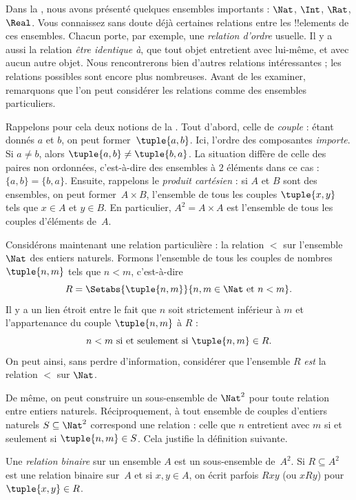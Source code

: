 \documentclass[11pt,a4paper,openany]{memoir}
\begin{document}
\begin{explain}
Dans la , nous avons présenté quelques
ensembles importants : $\Nat$, $\Int$, $\Rat$, $\Real$.
Vous connaissez sans doute déjà certaines relations entre les
!!{element}s de ces ensembles. Chacun porte, par exemple,
une \emph{relation d'ordre} usuelle. Il y a aussi la relation
\emph{être identique à}, que tout objet entretient avec lui-même,
et avec aucun autre objet. Nous rencontrerons bien d'autres
relations intéressantes ; les relations possibles sont encore
plus nombreuses. Avant de les examiner, remarquons que l'on
peut considérer les relations comme des ensembles particuliers.

Rappelons pour cela deux notions de la .
Tout d'abord, celle de \emph{couple} : étant donnés $a$ et $b$,
on peut former~$\tuple{a, b}$. Ici, l'ordre des composantes
\emph{importe}. Si $a \neq b$, alors
$\tuple{a, b} \neq \tuple{b, a}$.
La situation diffère de celle des paires non ordonnées,
c'est-à-dire des ensembles à $2$ éléments dans ce cas :
$\{a, b\}=\{b, a\}$.
Ensuite, rappelons le \emph{produit cartésien} : si $A$ et $B$
sont des ensembles, on peut former~$A \times B$, l'ensemble
de tous les couples $\tuple{x, y}$ tels que $x \in A$ et $y \in B$.
En particulier, $A^{2}= A \times A$ est l'ensemble de tous
les couples d'éléments de~$A$.

Considérons maintenant une relation particulière :
la relation $<$ sur l'ensemble~$\Nat$ des entiers naturels.
Formons l'ensemble de tous les couples de nombres $\tuple{n, m}$
tels que $n<m$, c'est-à-dire
\[
  R=\Setabs{\tuple{n, m}}{n, m \in \Nat \text{ et } n<m}.
\]
Il y a un lien étroit entre le fait que $n$ soit strictement
inférieur à $m$ et l'appartenance du couple $\tuple{n, m}$ à $R$ :
\[
      n<m\text{ si et seulement si }\tuple{n, m} \in R.
\]
On peut ainsi, sans perdre d'information, considérer que
l'ensemble $R$ \emph{est} la relation $<$ sur $\Nat$.

De même, on peut construire un sous-ensemble de $\Nat^{2}$
pour toute relation entre entiers naturels.
Réciproquement, à tout ensemble de couples d'entiers naturels
$S \subseteq \Nat^{2}$ correspond une relation :
celle que $n$ entretient avec $m$ si et seulement si
$\tuple{n, m} \in S$. Cela justifie la définition suivante.
\end{explain}

\begin{defn}
Une \emph{relation binaire} sur un ensemble $A$ est un
sous-ensemble de~$A^{2}$. Si $R \subseteq A^{2}$ est
une relation binaire sur~$A$ et si $x, y \in A$,
on écrit parfois $Rxy$ (ou $xRy$) pour $\tuple{x, y} \in R$.
\end{defn}
\end{document}
